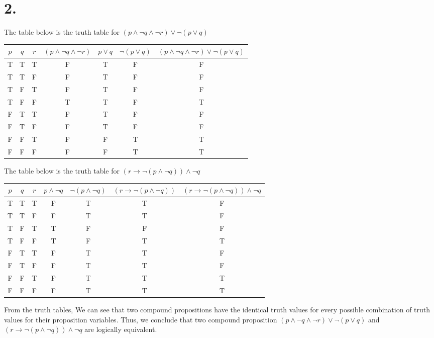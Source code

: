 \documentclass{article}
\renewcommand{\a}{\land}
\renewcommand{\o}{\lor}
\newcommand{\n}{\neg}
\begin{document}
	\section*{2.}
	The table below is the truth table for $(p \a \n q \a \n r) \o \n(p \o q) $ \\ 
	\begin{center}
		\begin{tabular}{| c | c | c || c | c | c || c |}
			\hline 
			$ p $ & $ q $ & $ r $ & $ (p \a \n q \a \n r) $ & $ p \o q $ & $ \n(p \o q) $ & $(p \a \n q \a \n r) \o \n(p \o q) $ \\
			\hline
			T & T & T & F & T & F & F\\
			\hline
			T & T & F & F & T & F & F\\
			\hline
			T & F & T & F & T & F & F\\
			\hline
			T & F & F & T & T & F & T\\
			\hline 
			F & T & T & F & T & F & F\\
			\hline
			F & T & F & F & T & F & F\\
			\hline
			F & F & T & F & F & T & T\\
			\hline 
			F & F & F & F & F & T & T\\
			\hline
		\end{tabular}
	\end{center}
	The table below is the truth table for $(r \to \n(p \a \n q)) \a \n q $
	\begin{center}
		\begin{tabular}{| c | c | c || c | c | c || c | }
			\hline 
			$ p $ & $ q $ & $ r $ & $ p \a \n q $ & $ \n(p \a \n q) $ & $(r \to  \n(p \a \n q))$ & $ (r \to \n(p \a \n q)) \a \n q $\\
			\hline
			T & T & T  & F & T  & T & F\\
			\hline
			T & T & F  & F & T  & T & F\\
			\hline
			T & F & T  & T & F  & F & F\\
			\hline
			T & F & F  & T & F  & T & T\\
			\hline 
			F & T & T  & F & T  & T & F\\
			\hline
			F & T & F  & F & T  & T & F\\
			\hline
			F & F & T  & F & T  & T & T\\
			\hline 
			F & F & F  & F & T  & T & T\\
			\hline
		\end{tabular}
	\end{center}
	From the truth tables, We can see that two compound propositions have the identical truth values for every possible combination of truth values for their proposition variables. Thus, we conclude that two compound proposition $(p \a \n q \a \n r) \o \n(p \o q) $ and $(r \to \n(p \a \n q)) \a \n q $ are logically equivalent.
\end{document}

